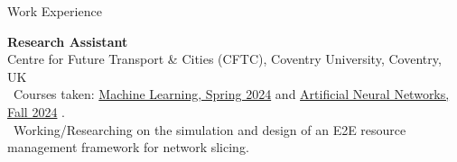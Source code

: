 \documentclass{resume}
\begin{document}
\newpage
\begin{rSection}{Work Experience}

    {\bf Research Assistant} \hfill
    \\[-1.3em]
    {\small Centre for Future Transport \& Cities (CFTC), Coventry University, Coventry, UK}\\
    \textbullet\ Courses taken: \href{https://github.com/sinaebrahimi/ml-7072cem}{Machine Learning, Spring 2024} \href{https://github.com/sinaebrahimi/ml-7072cem}{} and \href{https://github.com/sinaebrahimi/location-prediction-nn}{Artificial Neural Networks, Fall 2024} \href{https://github.com/sinaebrahimi/location-prediction-nn}{}.\\
    \textbullet\ Working/Researching on the simulation and design of an E2E resource management framework for network slicing.\\

    \vspace{0.2em}


\end{rSection}
\end{document}
